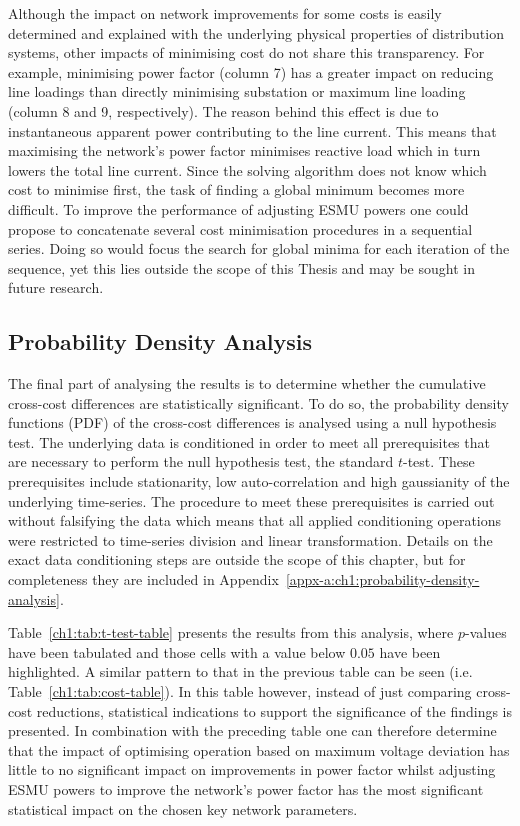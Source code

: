 Although the impact on network improvements for some costs is easily determined and explained with the underlying physical properties of distribution systems, other impacts of minimising cost do not share this transparency.
For example, minimising power factor (column 7) has a greater impact on reducing line loadings than directly minimising substation or maximum line loading (column 8 and 9, respectively).
The reason behind this effect is due to instantaneous apparent power contributing to the line current.
This means that maximising the network's power factor minimises reactive load which in turn lowers the total line current.
Since the solving algorithm does not know which cost to minimise first, the task of finding a global minimum becomes more difficult.
To improve the performance of adjusting ESMU powers one could propose to concatenate several cost minimisation procedures in a sequential series.
Doing so would focus the search for global minima for each iteration of the sequence, yet this lies outside the scope of this Thesis and may be sought in future research.

\subsection{Probability Density Analysis}
\label{ch1:subsec:probability-density-analysis}

The final part of analysing the results is to determine whether the cumulative cross-cost differences are statistically significant.
To do so, the probability density functions (PDF) of the cross-cost differences is analysed using a null hypothesis test.
The underlying data is conditioned in order to meet all prerequisites that are necessary to perform the null hypothesis test,  the standard $t$-test.
These prerequisites include stationarity, low auto-correlation and high gaussianity of the underlying time-series.
The procedure to meet these prerequisites is carried out without falsifying the data which means that all applied conditioning operations were restricted to time-series division and linear transformation.
Details on the exact data conditioning steps are outside the scope of this chapter, but for completeness they are included in Appendix~\ref{appx-a:ch1:probability-density-analysis}.



Table~\ref{ch1:tab:t-test-table} presents the results from this analysis, where $p$-values have been tabulated and those cells with a value below $0.05$ have been highlighted.
A similar pattern to that in the previous table can be seen (i.e. Table~\ref{ch1:tab:cost-table}).
In this table however, instead of just comparing cross-cost reductions, statistical indications to support the significance of the findings is presented.
In combination with the preceding table one can therefore determine that the impact of optimising operation based on maximum voltage deviation has little to no significant impact on improvements in power factor whilst adjusting ESMU powers to improve the network's power factor has the most significant statistical impact on the chosen key network parameters.
